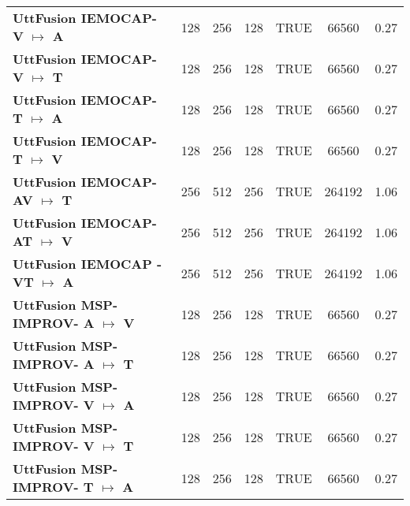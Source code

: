 \begin{table}[]
{\begin{tabular}{l|cccccc}
\textbf{UttFusion IEMOCAP- V $\mapsto$ A}      & 128                 & 256                  & 128                  & TRUE                & 66560                     & 0.27               \\
\textbf{UttFusion IEMOCAP- V $\mapsto$ T}      & 128                 & 256                  & 128                  & TRUE                & 66560                     & 0.27               \\
\textbf{UttFusion IEMOCAP- T $\mapsto$ A}      & 128                 & 256                  & 128                  & TRUE                & 66560                     & 0.27               \\
\textbf{UttFusion IEMOCAP- T $\mapsto$ V}      & 128                 & 256                  & 128                  & TRUE                & 66560                     & 0.27               \\
\textbf{UttFusion IEMOCAP- AV $\mapsto$ T}     & 256                 & 512                  & 256                  & TRUE                & 264192                    & 1.06               \\
\textbf{UttFusion IEMOCAP- AT $\mapsto$ V}     & 256                 & 512                  & 256                  & TRUE                & 264192                    & 1.06               \\
\textbf{UttFusion IEMOCAP - VT $\mapsto$ A}    & 256                 & 512                  & 256                  & TRUE                & 264192                    & 1.06               \\
\textbf{UttFusion MSP-IMPROV- A $\mapsto$ V}   & 128                 & 256                  & 128                  & TRUE                & 66560                     & 0.27               \\
\textbf{UttFusion MSP-IMPROV- A $\mapsto$ T}   & 128                 & 256                  & 128                  & TRUE                & 66560                     & 0.27               \\
\textbf{UttFusion MSP-IMPROV- V $\mapsto$ A}   & 128                 & 256                  & 128                  & TRUE                & 66560                     & 0.27               \\
\textbf{UttFusion MSP-IMPROV- V $\mapsto$ T}   & 128                 & 256                  & 128                  & TRUE                & 66560                     & 0.27               \\
\textbf{UttFusion MSP-IMPROV- T $\mapsto$ A}   & 128                 & 256                  & 128                  & TRUE                & 66560                     & 0.27               \\

\end{tabular}}
\end{table}

